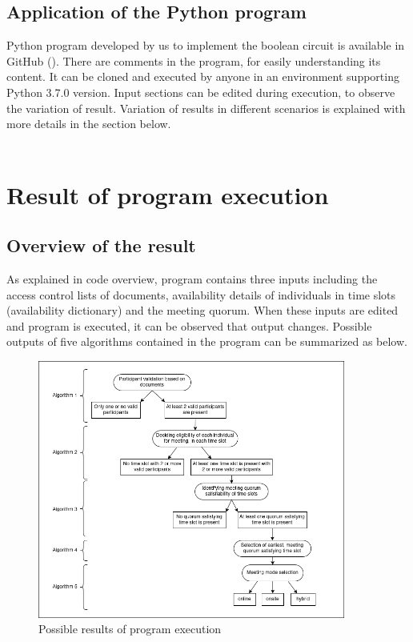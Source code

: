 \subsection{Application of the Python program}
Python program developed by us to implement the boolean circuit is available in GitHub (\cite{Thejana2025sympy_solver}). There are comments in the program, for easily understanding its content. It can be cloned and executed by anyone in an environment supporting Python 3.7.0 version. Input sections can be edited during execution, to observe the variation of result. Variation of results in different scenarios is explained with more details in the section below. \\ \\

\section{Result of program execution}
\subsection{Overview of the result}
As explained in code overview, program contains three inputs including the access control lists of documents, availability details of individuals in time slots (availability dictionary) and the meeting quorum. When these inputs are edited and program is executed, it can be observed that output changes. Possible outputs of five algorithms contained in the program can be summarized as below.\\ 
\begin{figure}[H]
    \centering
    \includegraphics[width=0.9\textwidth]{./image/workflow_execution_result.png}
    \caption{Possible results of program execution}
    \label{fig:possible results of program execution}
\end{figure}

